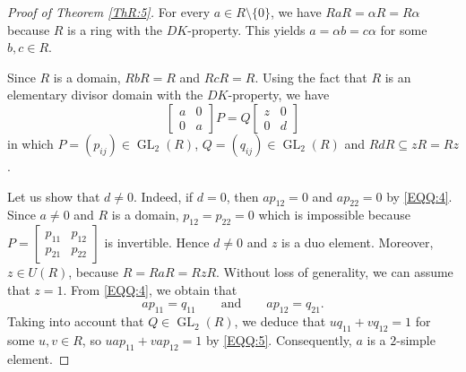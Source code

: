 \documentclass{cimart}
\DeclareMathOperator\GL{GL}
\begin{document}
\begin{proof}[Proof of Theorem \ref{ThR:5}]
For every $a\in R\setminus\{0\}$, we have $RaR=\alpha R=R\alpha$ because $R$ is a ring  with the $DK$-property. This  yields $a=\alpha b=c\alpha$ for some $b,c\in R$.

Since $R$ is a domain, $RbR=R$ and $RcR=R$. Using the fact that  $R$ is an elementary divisor domain with the $DK$-property, we have
\begin{equation}\label{EQQ:4}
\left[\begin{array}{cc}
      a & 0 \\
      0 & a
\end{array}\right]P=Q\left[\begin{array}{cc}
      z & 0 \\
      0 & d
\end{array}\right]
\end{equation}
in which  $P=(p_{ij})\in \GL_2(R)$, $Q=(q_{ij})\in \GL_2(R)$ and $RdR\subseteq zR=Rz$.

Let us show that $d\ne 0$. Indeed,  if $d=0$, then  $ap_{12}=0$ and  $ap_{22}=0$  by \eqref{EQQ:4}. Since $a\ne 0$ and $R$ is a domain,  $p_{12}=p_{22}=0$ which is impossible because
$P=\left[\begin{array}{cc}
      p_{11} & p_{12} \\
      p_{21} & p_{22}
\end{array}\right]$
is invertible. Hence  $d\ne 0$ and   $z$ is a  duo element. Moreover,  $z\in U(R)$, because  $R=RaR=RzR$. Without loss of generality,  we can assume that  $z=1$. From \eqref{EQQ:4}, we obtain that
    \begin{equation}\label{EQQ:5}
    ap_{11}=q_{11}\qquad\text{and}\qquad  ap_{12}=q_{21}.
    \end{equation}
Taking into account that  $Q\in \GL_2(R)$,  we deduce  that    $uq_{11}+vq_{12}=1$ for some $u,v\in R$, so $uap_{11}+vap_{12}=1$  by \eqref{EQQ:5}. Consequently,   $a$ is a $2$-simple element.
\end{proof}
\end{document}
